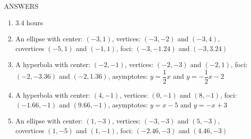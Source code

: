 \documentclass[12pt]{article}
\begin{document}
ANSWERS

\begin{multicols}{2}
\begin{enumerate}
	\item 3.4 hours
 	\item An ellipse with center: $(-3,1)$, vertices: $(-3,-2)$ and $(-3,4)$, 
    covertices $(-5,1)$ and $(-1,1)$,  foci: $(-3,-1.24)$ and $(-3,3.24)$
	\item A hyperbola with center: $(-2,-1)$, vertices: $(-2,-3)$ and $(-2,1)$, 
    foci: $(-2,-3.36)$ and $(-2,1.36)$, asymptotes: $y = \dfrac{1}{2} x$ and 
    $ y = - \dfrac{1}{2} x - 2$
	\item A hyperbola with center: $(4,-1)$, vertices: $(0,-1)$ and $(8,-1)$, 
    foci: $(-1.66,-1)$ and $(9.66,-1)$, asymptotes: $y = x - 5$ and 
    $ y = - x + 3$
 	\item An ellipse with center: $(1,-3)$, vertices: $(-3,-3)$ and $(5,-3)$, 
    covertices $(1,-5)$ and $(1,-1)$,  foci: $(-2.46,-3)$ and $(4.46,-3)$
\end{enumerate}
\end{multicols}
\end{document}
